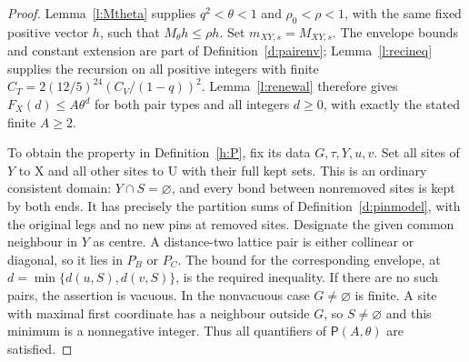 \begin{proof}
Lemma~\ref{l:Mtheta} supplies \(q^2<\theta<1\) and
\(\rho_0<\rho<1\), with the same fixed positive vector \(h\),
such that \(M_\theta h\le\rho h\).  Set
\(m_{XY,s}=M_{XY,s}\).  The envelope bounds and constant
extension are part of Definition~\ref{d:pairenv};
Lemma~\ref{l:recineq} supplies the recursion on all positive
integers with finite
\(C_T=2(12/5)^{24}(C_V/(1-q))^2\).
Lemma~\ref{l:renewal} therefore gives
\(F_X(d)\le A\theta^d\) for both pair types and all integers
\(d\ge0\), with exactly the stated finite \(A\ge2\).

To obtain the property in Definition~\ref{h:P}, fix its data
\(G,\tau,Y,u,v\).  Set all sites of \(Y\) to \(\mathrm X\)
and all other sites to \(\mathrm U\) with their full kept sets.
This is an ordinary consistent domain: \(Y\cap S=\varnothing\),
and every bond between nonremoved sites is kept by both ends.
It has precisely the partition sums of
Definition~\ref{d:pinmodel}, with the original legs and no new
pins at removed sites.  Designate the given common neighbour in
\(Y\) as centre.  A distance-two lattice pair is either collinear
or diagonal, so it lies in \(P_B\) or \(P_C\).
The bound for the corresponding envelope, at
\(d=\min\{d(u,S),d(v,S)\}\), is the required inequality.
If there are no such pairs, the assertion is vacuous.  In the
nonvacuous case \(G\ne\varnothing\) is finite.  A site with
maximal first coordinate has a neighbour outside \(G\), so
\(S\ne\varnothing\) and this minimum is a nonnegative integer.
Thus all quantifiers
of \(\mathsf P(A,\theta)\) are satisfied.
\end{proof}
